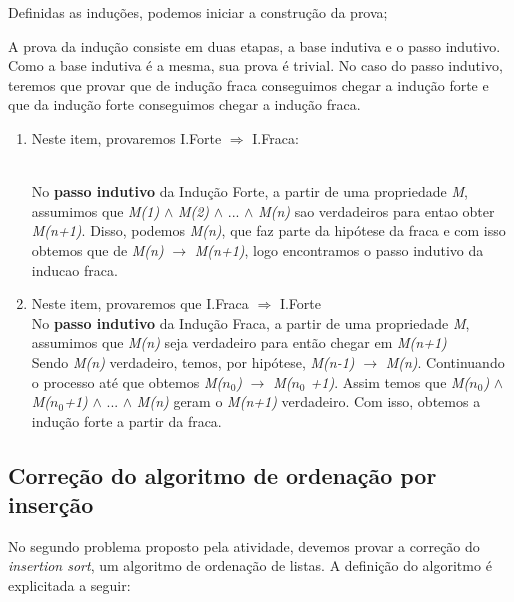 \documentclass[a4paper, 10pt]{article}
\begin{document}
Definidas as induções, podemos iniciar a construção da prova; 

A prova da indução consiste em duas etapas, a base indutiva e o passo indutivo.
Como a base indutiva é a mesma, sua prova é trivial.
No caso do passo indutivo, teremos que provar que de indução fraca conseguimos chegar a indução forte e que da indução forte conseguimos chegar a indução fraca.

\begin{enumerate}
\item Neste item, provaremos I.Forte $\Rightarrow$ I.Fraca:

	\\No \textbf{passo indutivo} da Indução Forte, a partir de uma propriedade \textit{M}, assumimos que \textit{M(1)} $\wedge$ \textit{M(2)} $\wedge$ ... $\wedge$ \textit{M(n)} sao verdadeiros para entao obter \textit{M(n+1)}. 
    Disso, podemos  \textit{M(n)}, que faz parte da hipótese da fraca e com isso obtemos que de \textit{M(n)} $\rightarrow$ \textit{M(n+1)}, logo encontramos o passo indutivo da inducao fraca.

\item Neste item, provaremos que I.Fraca $\Rightarrow$ I.Forte 
	\\	No \textbf{passo indutivo} da Indução Fraca, a partir de uma propriedade \textit{M}, assumimos que \textit{M(n)} seja verdadeiro para então chegar em \textit{M(n+1)}
    \\	Sendo \textit{M(n)} verdadeiro, temos, por hipótese, \textit{M(n-1)} $\rightarrow$ \textit{M(n)}. Continuando o processo até que obtemos \textit{M($n_0$)} $\rightarrow$ \textit{M($n_0$ +1)}. Assim temos que \textit{M($n_0$)} $\wedge$ \textit{M($n_0$+1)} $\wedge$ ... $\wedge$ \textit{M(n)} geram o \textit{M(n+1)} verdadeiro.
    Com isso, obtemos a indução forte a partir da fraca.
\end{enumerate}


\subsection{Correção do algoritmo de ordenação por inserção}
\label{sec:insertion}

No segundo problema proposto pela atividade, devemos provar a correção do \textit{insertion sort}, um algoritmo de ordenação de listas. A definição do algoritmo é explicitada a seguir:
\end{document}
